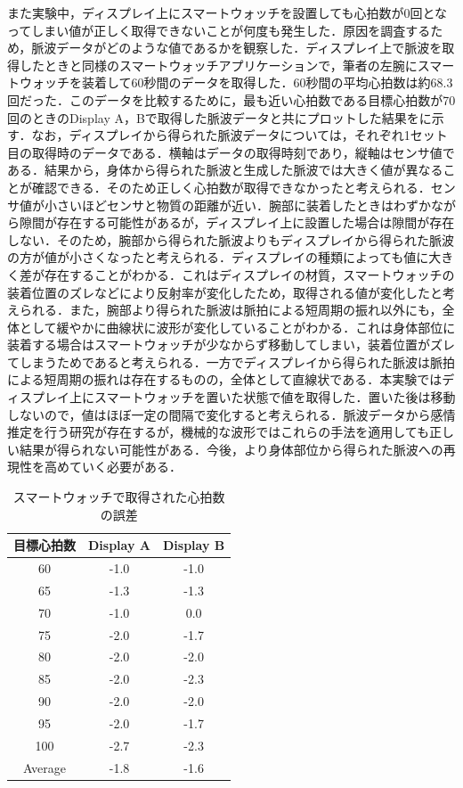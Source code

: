 \documentclass[Japanese,noauthor]{dicomopapers}
\begin{document}
また実験中，ディスプレイ上にスマートウォッチを設置しても心拍数が0回となってしまい値が正しく取得できないことが何度も発生した．原因を調査するため，脈波データがどのような値であるかを観察した．ディスプレイ上で脈波を取得したときと同様のスマートウォッチアプリケーションで，筆者の左腕にスマートウォッチを装着して60秒間のデータを取得した．60秒間の平均心拍数は約68.3回だった．このデータを比較するために，最も近い心拍数である目標心拍数が70回のときのDisplay A，Bで取得した脈波データと共にプロットした結果をに示す．なお，ディスプレイから得られた脈波データについては，それぞれ1セット目の取得時のデータである．横軸はデータの取得時刻であり，縦軸はセンサ値である．結果から，身体から得られた脈波と生成した脈波では大きく値が異なることが確認できる．そのため正しく心拍数が取得できなかったと考えられる．センサ値が小さいほどセンサと物質の距離が近い．腕部に装着したときはわずかながら隙間が存在する可能性があるが，ディスプレイ上に設置した場合は隙間が存在しない．そのため，腕部から得られた脈波よりもディスプレイから得られた脈波の方が値が小さくなったと考えられる．ディスプレイの種類によっても値に大きく差が存在することがわかる．これはディスプレイの材質，スマートウォッチの装着位置のズレなどにより反射率が変化したため，取得される値が変化したと考えられる．また，腕部より得られた脈波は脈拍による短周期の振れ以外にも，全体として緩やかに曲線状に波形が変化していることがわかる．これは身体部位に装着する場合はスマートウォッチが少なからず移動してしまい，装着位置がズレてしまうためであると考えられる．一方でディスプレイから得られた脈波は脈拍による短周期の振れは存在するものの，全体として直線状である．本実験ではディスプレイ上にスマートウォッチを置いた状態で値を取得した．置いた後は移動しないので，値はほぼ一定の間隔で変化すると考えられる．脈波データから感情推定を行う研究\cite{emotion_recognition_poincare}\cite{pulse_order_picking}\cite{fast_emotion_recognition}が存在するが，機械的な波形ではこれらの手法を適用しても正しい結果が得られない可能性がある．今後，より身体部位から得られた脈波への再現性を高めていく必要がある．

\begin{table}[!t]
  \centering
  \caption{スマートウォッチで取得された心拍数の誤差}
  \begin{tabular}{c|c|c} \hline\hline
    目標心拍数 & Display A & Display B \\ \hline
    60 & -1.0 & -1.0 \\
    65 & -1.3 & -1.3 \\
    70 & -1.0 & 0.0 \\
    75 & -2.0 & -1.7 \\
    80 & -2.0 & -2.0 \\
    85 & -2.0 & -2.3 \\
    90 & -2.0 & -2.0 \\
    95 & -2.0 & -1.7 \\
    100 & -2.7 & -2.3 \\ \hline
    Average & -1.8 & -1.6 \\ \hline
  \end{tabular}
  \label{tab:heartrate}
\end{table}
\end{document}
